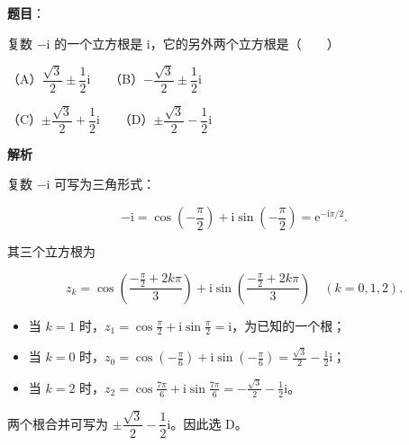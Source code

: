 \begin{answer}

\textbf{题目}：

复数 $-\mathrm{i}$ 的一个立方根是 $\mathrm{i}$，它的另外两个立方根是\mbox{（　　）}

（A）$\dfrac{\sqrt3}2\pm\dfrac12\mathrm{i}$　　（B）$-\dfrac{\sqrt3}2\pm\dfrac12\mathrm{i}$

（C）$\pm\dfrac{\sqrt3}2+\dfrac12\mathrm{i}$　　（D）$\pm\dfrac{\sqrt3}2-\dfrac12\mathrm{i}$

\textbf{解析}

复数 $-\mathrm{i}$ 可写为三角形式：

\nopagebreak[4]
\[
-\mathrm{i} = \cos\left(-\frac\pi2\right) + \mathrm{i}\sin\left(-\frac\pi2\right) = \mathrm{e}^{-\mathrm{i}\pi/2}.
\]

其三个立方根为

\nopagebreak[4]
\[
z_k = \cos\left(\frac{-\frac\pi2 + 2k\pi}{3}\right) + \mathrm{i}\sin\left(\frac{-\frac\pi2 + 2k\pi}{3}\right)\quad (k=0,1,2).
\]

\begin{itemize}
\item 当 $k=1$ 时，$z_1 = \cos\frac\pi2 + \mathrm{i}\sin\frac\pi2 = \mathrm{i}$，为已知的一个根；
\item 当 $k=0$ 时，$z_0 = \cos\left(-\frac\pi6\right) + \mathrm{i}\sin\left(-\frac\pi6\right) = \frac{\sqrt3}{2} - \frac12\mathrm{i}$；
\item 当 $k=2$ 时，$z_2 = \cos\frac{7\pi}6 + \mathrm{i}\sin\frac{7\pi}6 = -\frac{\sqrt3}{2} - \frac12\mathrm{i}$。
\end{itemize}

两个根合并可写为 $\pm\dfrac{\sqrt3}{2}-\dfrac12\mathrm{i}$。因此选 D。


\end{answer}
